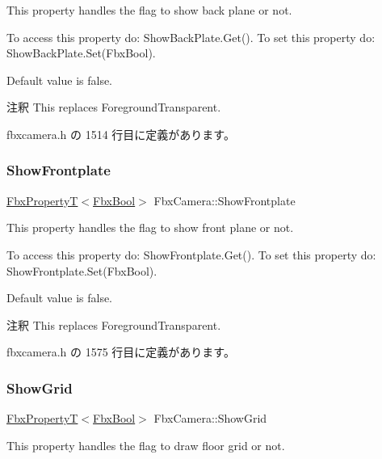 This property handles the flag to show back plane or not.

To access this property do\+: Show\+Back\+Plate.\+Get(). To set this property do\+: Show\+Back\+Plate.\+Set(\+Fbx\+Bool).

Default value is false. \begin{DoxyRemark}{注釈}
This replaces Foreground\+Transparent. 
\end{DoxyRemark}


 fbxcamera.\+h の 1514 行目に定義があります。

\mbox{\label{class_fbx_camera_adcb25c847c2d7d471c836722ce1289ff}} 
\subsubsection{\texorpdfstring{Show\+Frontplate}{ShowFrontplate}}
{\footnotesize\ttfamily \hyperlink{class_fbx_property_t}{Fbx\+PropertyT}$<$\hyperlink{fbxtypes_8h_a92e0562b2fe33e76a242f498b362262e}{Fbx\+Bool}$>$ Fbx\+Camera\+::\+Show\+Frontplate}

This property handles the flag to show front plane or not.

To access this property do\+: Show\+Frontplate.\+Get(). To set this property do\+: Show\+Frontplate.\+Set(\+Fbx\+Bool).

Default value is false. \begin{DoxyRemark}{注釈}
This replaces Foreground\+Transparent. 
\end{DoxyRemark}


 fbxcamera.\+h の 1575 行目に定義があります。

\mbox{\label{class_fbx_camera_ac44b2aec0ace4b978979e5bd3f9cd384}} 
\subsubsection{\texorpdfstring{Show\+Grid}{ShowGrid}}
{\footnotesize\ttfamily \hyperlink{class_fbx_property_t}{Fbx\+PropertyT}$<$\hyperlink{fbxtypes_8h_a92e0562b2fe33e76a242f498b362262e}{Fbx\+Bool}$>$ Fbx\+Camera\+::\+Show\+Grid}

This property handles the flag to draw floor grid or not.

